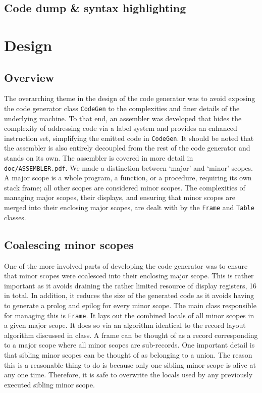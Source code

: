 \documentclass[oneside]{amsart}
\theoremstyle{definition}
\theoremstyle{remark}
\numberwithin{equation}{section}
\begin{document}
\subsection{Code dump \& syntax highlighting}

\section{Design}
\subsection{Overview}
The overarching theme in the design of the code generator was to avoid exposing the code generator
class \texttt{CodeGen} to the complexities and finer details of the underlying machine. To that end,
an assembler was developed that hides the complexity of addressing code via a label system and
provides an enhanced instruction set, simplifying the emitted code in \texttt{CodeGen}. It should be
noted that the assembler is also entirely decoupled from the rest of the code generator and stands
on its own. The assembler is covered in more detail in \texttt{doc/ASSEMBLER.pdf}. We made a
distinction  between `major' and `minor' scopes. A major scope is a whole program, a function, or a
procedure, requiring its own stack frame; all other scopes are considered minor scopes. The
complexities of  managing major scopes, their displays, and ensuring that minor scopes are merged
into their enclosing  major scopes, are dealt with by the \texttt{Frame} and \texttt{Table} classes.

\subsection{Coalescing minor scopes}
One of the more involved parts of developing the code generator was to ensure that minor scopes were
coalesced into their enclosing major scope. This is rather important as it avoids draining the
rather limited resource of display registers, 16 in total. In addition, it reduces the size of the
generated code as it avoids having to generate a prolog and epilog for every minor scope. The main
class responsible for managing this is \texttt{Frame}. It lays out the combined locals of all minor
scopes in a given major scope. It does so via an algorithm identical to the record layout algorithm
discussed in class. A frame can be thought of as a record corresponding to a major scope where all
minor scopes are sub-records. One important detail is that sibling minor scopes can be thought of as
belonging to a union. The reason this is a reasonable thing to do is because only one sibling minor
scope is alive at any one time. Therefore, it is safe to overwrite the locals used by any previously
executed sibling minor scope.
\end{document}
